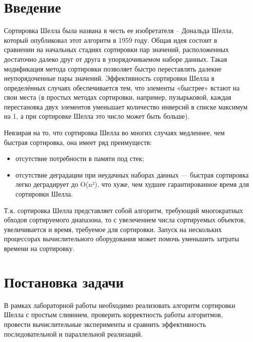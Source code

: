 \documentclass{report}
\begin{document}
\setcounter{page}{2}

\tableofcontents
\newpage

\section*{Введение}
Сортировка Шелла была названа в честь ее изобретателя – Дональда Шелла, который опубликовал этот алгоритм в 1959 году. Общая идея состоит в сравнении на начальных стадиях сортировки пар значений, расположенных достаточно далеко друг от друга в упорядочиваемом наборе данных. Такая модификация метода сортировки позволяет быстро переставлять далекие неупорядоченные пары значений. Эффективность сортировки Шелла в определённых случаях обеспечивается тем, что элементы «быстрее» встают на свои места (в простых методах сортировки, например, пузырьковой, каждая перестановка двух элементов уменьшает количество инверсий в списке максимум на 1, а при сортировке Шелла это число может быть больше).

Невзирая на то, что сортировка Шелла во многих случаях медленнее, чем быстрая сортировка, она имеет ряд преимуществ:
\begin{itemize}
  \item отсутствие потребности в памяти под стек;
  \item отсутствие деградации при неудачных наборах данных — быстрая сортировка легко деградирует до O(n²), что хуже, чем худшее гарантированное время для сортировки Шелла.
\end{itemize}
    
Т.к. сортировка Шелла представляет собой алгоритм, требующий многократных обходов сортируемого диапазона, то с увелечением числа сортируемых объектов, увеличивается и время, требуемое для сортировки. Запуск на нескольких процессорах вычислительного оборудования может помочь уменьшить затраты времени на сортировку.

\newpage

\section*{Постановка задачи}
В рамках лабораторной работы необходимо реализовать алгоритм сортировки Шелла с простым слиянием, проверить корректность работы алгоритмов, провести вычислительные эксперименты и сравнить эффективность последовательной и параллельной реализаций.
\end{document}
